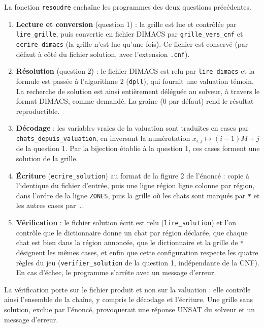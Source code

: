 \documentclass[11pt,a4paper]{article}
\newcommand{\x}[2]{x_{#1,#2}}
\begin{document}
La fonction \texttt{resoudre} enchaîne les programmes des deux questions précédentes.
\begin{enumerate}
  \item \textbf{Lecture et conversion} (question 1) : la grille est lue et contrôlée par
        \texttt{lire\_grille}, puis convertie en fichier DIMACS par \texttt{grille\_vers\_cnf} et
        \texttt{ecrire\_dimacs} (la grille n'est lue qu'une fois). Ce fichier
        est conservé (par défaut à côté du fichier solution, avec l'extension \texttt{.cnf}).
  \item \textbf{Résolution} (question 2) : le fichier DIMACS est relu par \texttt{lire\_dimacs}
        et la formule est passée à l'algorithme 2 (\texttt{dpll}), qui fournit une valuation
        témoin. La recherche de solution est ainsi entièrement déléguée au solveur, à travers le
        format DIMACS, comme demandé. La graine (0 par défaut) rend le résultat reproductible.
  \item \textbf{Décodage} : les variables vraies de la valuation sont traduites en cases par
        \texttt{chats\_depuis\_valuation}, en inversant la numérotation $\x ij\mapsto(i-1)M+j$
        de la question 1. Par la bijection établie à la question 1, ces cases forment une
        solution de la grille.
  \item \textbf{Écriture} (\texttt{ecrire\_solution}) au format de la figure 2 de l'énoncé :
        copie à l'identique du fichier d'entrée, puis une ligne \og région ligne colonne\fg{} par
        région, dans l'ordre de la ligne \texttt{ZONES}, puis la grille où les chats sont marqués
        par \texttt{*} et les autres cases par \texttt{.}.
  \item \textbf{Vérification} : le fichier solution écrit est relu (\texttt{lire\_solution}) et
        l'on contrôle que le dictionnaire donne un chat par région déclarée, que chaque chat est
        bien dans la région annoncée, que le dictionnaire et la grille de \texttt{*} désignent les
        mêmes cases, et enfin que cette configuration respecte les quatre règles du jeu
        (\texttt{verifier\_solution} de la question 1, indépendante de la CNF). En cas d'échec, le
        programme s'arrête avec un message d'erreur.
\end{enumerate}
La vérification porte sur le fichier produit et non sur la valuation : elle contrôle ainsi
l'ensemble de la chaîne, y compris le décodage et l'écriture. Une grille sans solution, exclue par
l'énoncé, provoquerait une réponse UNSAT du solveur et un message d'erreur.
\end{document}
